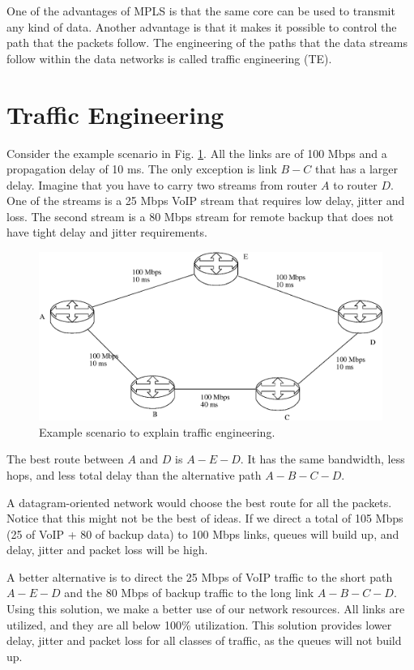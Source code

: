 One of the advantages of MPLS is that the same core can be used to transmit any kind of data.
Another advantage is that it makes it possible to control the path that the packets follow.
The engineering of the paths that the data streams follow within the data networks is called traffic engineering (TE).

\section{Traffic Engineering}

Consider the example scenario in Fig. \ref{fig:traffic-engineering}.
All the links are of 100 Mbps and a propagation delay of 10 ms.
The only exception is link $B-C$ that has a larger delay.
Imagine that you have to carry two streams from router $A$ to router $D$.
One of the streams is a 25 Mbps VoIP stream that requires low delay, jitter and loss.
The second stream is a 80 Mbps stream for remote backup that does not have tight delay and jitter requirements.

\begin{figure}[!h]
\centering
\includegraphics[width=\linewidth]{figures/traffic-engineering.eps}
\caption{Example scenario to explain traffic engineering.}
\label{fig:traffic-engineering}
\end{figure}

The best route between $A$ and $D$ is $A-E-D$.
It has the same bandwidth, less hops, and less total delay than the alternative path $A-B-C-D$.

A datagram-oriented network would choose the best route for all the packets.
Notice that this might not be the best of ideas.
If we direct a total of 105 Mbps (25 of VoIP + 80 of backup data) to 100 Mbps links, queues will build up, and delay, jitter and packet loss will be high.

A better alternative is to direct the 25 Mbps of VoIP traffic to the short path $A-E-D$ and the 80 Mbps of backup traffic to the long link $A-B-C-D$.
Using this solution, we make a better use of our network resources.
All links are utilized, and they are all below 100\% utilization.
This solution provides lower delay, jitter and packet loss for all classes of traffic, as the queues will not build up.

